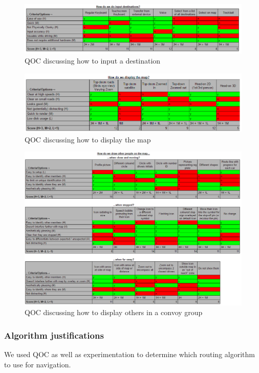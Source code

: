 \documentclass{article}
\begin{document}
\begin{figure}[H]
  \centering
  \includegraphics[scale=0.5]{qoc-nav-input}
  \caption{QOC discussing how to input a destination}\label{qoc-input}
\end{figure}

\begin{figure}[H]
  \centering
  \includegraphics[scale=0.5]{qoc-nav-map}
  \caption{QOC discussing how to display the map}\label{qoc-map}
\end{figure}

\begin{figure}[H]
  \centering
  \includegraphics[scale=0.5]{qoc-convoy}
  \caption{QOC discussing how to display others in a convoy group}\label{qoc-convoy}
\end{figure}

\subsubsection{Algorithm justifications}\label{sssec:nav-design-alg}
We used QOC as well as experimentation to determine which routing algorithm to use for navigation.
\end{document}
